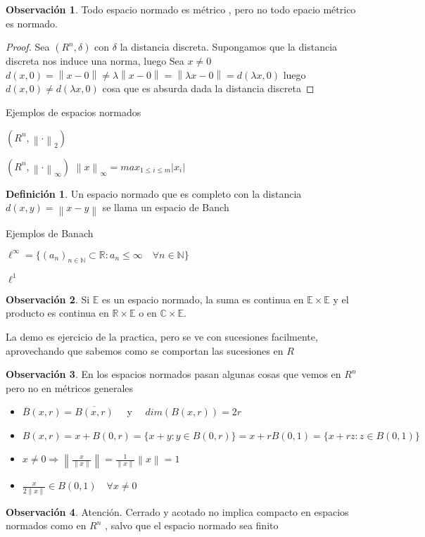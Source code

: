 \documentclass[12pt]{article}
\newcommand{\C}{\mathbb{C}}
\newcommand{\R}{\mathbb{R}}
\newcommand{\E}{\mathbb{E}}
\newcommand{\N}{\mathbb{N}}
\newcommand{\Ra}{\Rightarrow}
\newcommand{\ol}{\overline}
\newcommand{\norm}[1]{\left\lVert#1\right\rVert}
\theoremstyle{definition}
\newtheorem{definition}{Definición}[section]
\newtheorem*{remark}{Observación}
\begin{document}
\begin{remark}
Todo espacio normado es métrico , pero no todo epacio métrico es normado. 

	\begin{proof}Sea $(R^n,\delta)$ con $\delta$ la distancia discreta. Supongamos que la distancia discreta nos induce una norma, luego Sea $x \neq 0$ $ d(x,0) = \norm{x-0} \neq \lambda \norm{x-0} = \norm {\lambda x - 0 } = d(\lambda x,0)$ luego $d(x,0) \neq d(\lambda x,0)$ cosa que es absurda dada la distancia discreta
	\end{proof}
	Ejemplos de espacios normados

	$(R^n,\norm {\cdot}_{2})$
	
	$(R^n,\norm {\cdot}_{\infty})$ $\norm{x}_{\infty} = max_{1 \leq i \leq m} |x_{i}|$

\end{remark}
\begin{definition}
	Un espacio normado que es completo con la distancia $d(x,y) = \norm{x-y}$ se llama un espacio de Banch

	Ejemplos de Banach

	$\ell^{\infty} = \{(a_{n})_{n \in \N} \subset \R : a_{n} \leq \infty \quad \forall n \in \N \} $

	$\ell^1$

      \end{definition}
      \begin{remark}
	Si $\E$ es un espacio normado, la suma es continua en $\E \times \E$ y el producto es continua en $\R \times \E$ o en $\C \times \E$. 

	La demo es ejercicio de la practica, pero se ve con sucesiones facilmente, aprovechando que sabemos como se comportan las sucesiones en $R$  
      \end{remark}
      \begin{remark}
	En los espacios normados pasan algunas cosas que vemos en $R^n$ pero no en métricos generales
\begin{itemize}
  \item $\ol B(x,r) = \ol{B(x,r)}\quad $ y $\quad dim(B(x,r)) = 2r$
  \item $B(x,r) = x + B(0,r) = \{x+y : y\in B(0,r)\} = x +rB(0,1) = \{x+rz : z \in B(0,1)\}$
  \item $ x \neq 0 \Ra \norm{\frac{x}{\norm{x}}}= \frac{1}{\norm{x}} \norm{x} = 1  $
  \item $\frac{x}{2 \norm{x}} \in B(0,1) \quad \forall x \neq 0$
\end{itemize}
      \end{remark}
      \begin{remark}
	Atención. Cerrado y acotado no implica compacto en espacios normados como en $R^n$ , salvo que el espacio normado sea finito
      \end{remark}
\end{document}
